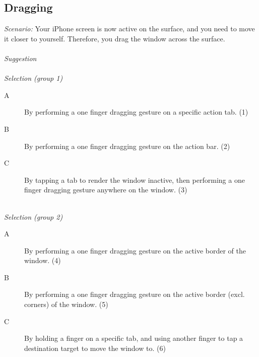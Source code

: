 
\subsection{Dragging}
\emph{Scenario:}
Your iPhone screen is now active on the surface, and you need to move it closer to yourself. Therefore, you drag the window across the surface.
\hfill\\
\hfill\\
\emph{Suggestion}
\hfill\\
\hfill\\
\emph{Selection (group 1)}
\begin{description}
\item[A]{By performing a one finger dragging gesture on a specific action tab. (1)}
\item[B]{By performing a one finger dragging gesture on the action bar. (2)}
\item[C]{By tapping a tab to render the window inactive, then performing a one finger dragging gesture anywhere on the window. (3)}
\end{description}
\hfill\\
\emph{Selection (group 2)}
\begin{description}
\item[A]{By performing a one finger dragging gesture on the active border of the window. (4)}
\item[B]{By performing a one finger dragging gesture on the active border (excl. corners) of the window. (5)}
\item[C]{By holding a finger on a specific tab, and using another finger to tap a destination target to move the window to. (6)}
\end{description}


